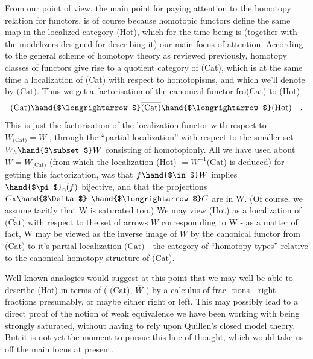 
From our point of view, the main point for paying attention to the
homotopy relation for functors, is of course because homotopic functors
define the same map in the localized category (Hot), which for the time
being is (together with the modelizers designed for describing it) our
main focus of attention. According to the general scheme of homotopy
theory as reviewed previously, homotopy classes of functors give rise
to a quotient category of (Cat), which is at the same time a localization
of (Cat) with respect to homotopisms, and which we'll denote by $\overline{\text{(Cat)}}$.
Thus we get a factorisation of the canonical functor fro(Cat) to (Hot)
\[ \text{(Cat)} \hand{$\longrightarrow$} \overline{\text{(Cat)}} \hand{$\longrightarrow$} \text{(Hot)} \quad . \]
Th\uline{is} is just the factorisation of the localization functor with respect
to $W_{\text{(Cat)}} = W$ , through the ``\uline{partial} \uline{localization}'' with respect to the
smaller set $W_h \hand{$\subset$} W$ consisting of homotopi\hand{|}only. All we have used about
$W = W_{\text{(Cat)}}$ (from which the localization (Hot) $= W^{-1}$(Cat) is deduced) for
getting this factorization, was that $f \hand{$\in$} W$ implies $\hand{$\pi$}_0(f)$ bijective,\hand{*} and
that the projections $C\mathrm{x}\hand{$\Delta$}_1 \hand{$\longrightarrow$} C$ are in W. (Of course, we assume tacitly
that W is saturated too.)  We may view (Hot)
as a localization of $\overline{\text{(Cat)}}$ with respect to the set of arrows $\overline{W}$ correspon%
ding to W - as a matter of fact, W may be viewed as the inverse image
of $\overline{W}$ by the canonical functor from (Cat) to it's partial localization
$\overline{\text{(Cat)}}$ - the category of ``homotopy types'' relative to the canonical
homotopy structure of (Cat).

Well known analogies would suggest at this point that we may well be
able to describe (Hot) in terms of ( $\overline{\text{(Cat)}}$, $\overline{W}$ ) by a \uline{calculus of frac-}%
\uline{tions} - right fractions presumably, or maybe either right or left. This
may possibly lead to a direct proof of the notion of weak equivalence we
have been working with being strongly saturated, without having to rely
upon Quillen's closed model theory. But it is not yet the moment to pursue
this line of thought, which would take us off the main focus at present.

